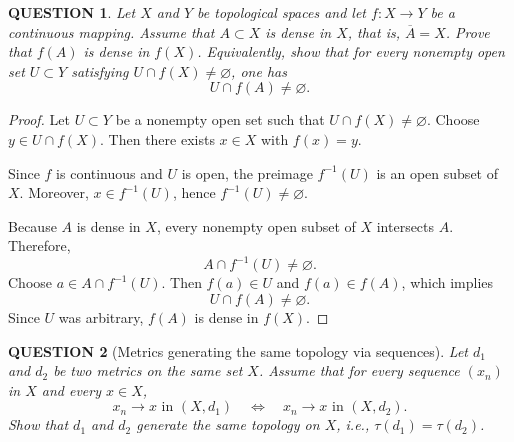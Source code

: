 \documentclass[12pt]{article}
\renewcommand{\(}{\left(}%
\renewcommand{\)}{\right)}%
\renewcommand{\[}{\left[}%
\renewcommand{\]}{\right]}%
\newtheorem{question}{QUESTION}[section]}
\newtheorem{proof}{Proof.}}
\begin{document}
\begin{question}
  	Let $X$ and $Y$ be topological spaces and let $f:X\to Y$ be a continuous mapping.
Assume that $A\subset X$ is dense in $X$, that is, $\overline{A}=X$.
Prove that $f(A)$ is dense in $f(X)$.
Equivalently, show that for every nonempty open set $U\subset Y$ satisfying $U\cap f(X)\neq\varnothing$, one has
\begin{equation*}
U\cap f(A)\neq\varnothing.
\end{equation*}
  \end{question}
  

\begin{proof}
Let $U\subset Y$ be a nonempty open set such that $U\cap f(X)\neq\varnothing$.
Choose $y\in U\cap f(X)$.
Then there exists $x\in X$ with $f(x)=y$.

Since $f$ is continuous and $U$ is open, the preimage $f^{-1}(U)$ is an open
subset of $X$.
Moreover, $x\in f^{-1}(U)$, hence $f^{-1}(U)\neq\varnothing$.

Because $A$ is dense in $X$, every nonempty open subset of $X$ intersects $A$.
Therefore,
\begin{equation*}
A\cap f^{-1}(U)\neq\varnothing.
\end{equation*}
Choose $a\in A\cap f^{-1}(U)$.
Then $f(a)\in U$ and $f(a)\in f(A)$, which implies
\begin{equation*}
U\cap f(A)\neq\varnothing.
\end{equation*}
Since $U$ was arbitrary, $f(A)$ is dense in $f(X)$.
\end{proof}

\begin{question}[Metrics generating the same topology via sequences]
Let $d_1$ and $d_2$ be two metrics on the same set $X$. Assume that for every sequence $(x_n)$ in $X$ and every $x\in X$,
\begin{equation*}
x_n \to x \text{ in } (X,d_1)\quad \Longleftrightarrow\quad x_n \to x \text{ in } (X,d_2).
\end{equation*}
Show that $d_1$ and $d_2$ generate the same topology on $X$, i.e., $\tau(d_1)=\tau(d_2)$.
\end{question}
\end{document}
